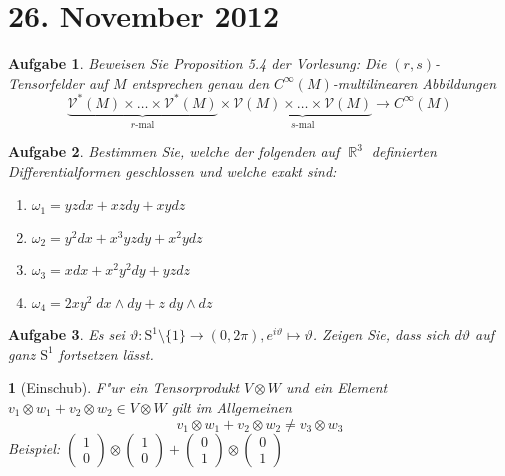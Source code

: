 \documentclass[paper=A4, twoside, chapterprefix=true, bibliography=totoc, headsepline]{scrbook}
\let\temp\phi
\let\phi\varphi
\let\varphi\temp
\let\temp\theta
\let\theta\vartheta
\let\vartheta\temp
\let\temp\epsilon
\let\epsilon\varepsilon
\let\varepsilon\temp
\let\temp\rho
\let\rho\varrho
\let\varrho\temp
\DeclareMathOperator{\R}{\mathbb{R}}
\theoremstyle{plain}
\theoremstyle{nonumberplain}
\theoremstyle{empty}
\newtheorem{emptythm}{}%
\theoremstyle{break}
\newtheorem{Aufg}{Aufgabe}
\begin{document}

\section{26. November 2012}
\setcounter{Aufg}{0} %
\setcounter{Loes}{0}

\begin{Aufg}
Beweisen Sie Proposition 5.4 der Vorlesung: Die $(r,s)$-Tensorfelder auf $M$ entsprechen genau den $C^\infty(M)$-multilinearen Abbildungen
	\[\underbrace{\mathcal{V^*}(M) \times \dots \times \mathcal{V^*}(M)}_\text{$r$-mal} \times \underbrace{\mathcal{V}(M)\times \dots \times \mathcal{V}(M)}_\text{$s$-mal} \to C^\infty(M)\]
\end{Aufg}

\begin{Aufg}
Bestimmen Sie, welche der folgenden auf $\R^3$ definierten Differentialformen geschlossen und  welche exakt sind:
\begin{enumerate}[label=\alph*),leftmargin=*,widest=b]
\item
	$\omega_1=y z dx + x z d y + x y dz$
\item
	$\omega_2=y^2 dx + x^3 y z d y + x^2 y dz$
\item
	$\omega_3=x dx + x^2 y^2 d y + y  z dz$
\item
	$\omega_4=2 xy^2 \;dx\wedge dy +  z \;d y\wedge dz$
\end{enumerate}\end{Aufg}

\begin{Aufg}
Es sei $\theta: \mathrm{S}^1\setminus \{1\} \to (0,2\pi), e^{i \theta} \mapsto \theta$. Zeigen Sie, dass sich $d\theta$ auf ganz $\mathrm{S}^1$ fortsetzen lässt.
\end{Aufg}

\begin{emptythm}[Einschub]
F"ur ein Tensorprodukt $V \otimes W$ und ein Element $v_1 \otimes w_1 + v_2 \otimes w_2 \in V \otimes W$ gilt im Allgemeinen
	\[v_1 \otimes w_1 + v_2 \otimes w_2 \ne v_3 \otimes w_3 \]
\emph{Beispiel:} $\left( \begin{smallmatrix} 1 \\ 0 \end{smallmatrix} \right) \otimes \left( \begin{smallmatrix} 1 \\ 0 \end{smallmatrix} \right) + \left( \begin{smallmatrix} 0 \\ 1 \end{smallmatrix} \right) \otimes \left( \begin{smallmatrix} 0 \\ 1 \end{smallmatrix} \right)$
\end{emptythm}
\end{document}
